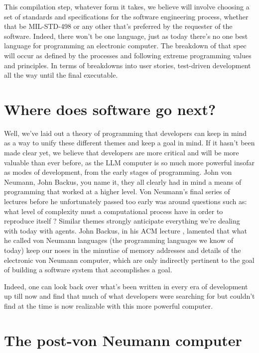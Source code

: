 \documentclass[12pt]{extarticle}
\begin{document}
This compilation step, whatever form it takes, we believe will involve choosing a set of standards and specifications for the software engineering process, whether that be MIL-STD-498 or any other that's preferred by the requester of the software. Indeed, there won't be one language, just as today there's no one best language for programming an electronic computer. The breakdown of that spec will occur as defined by the processes and following extreme programming values and principles. In terms of breakdowns into user stories, test-driven development all the way until the final executable.

\section{Where does software go next?}

Well, we've laid out a theory of programming that developers can keep in mind as a way to unify these different themes and keep a goal in mind. If it hasn't been made clear yet, we believe that developers are more critical and will be more valuable than ever before, as the LLM computer is so much more powerful insofar as modes of development, from the early stages of programming. John von Neumann, John Backus, you name it, they all clearly had in mind a means of programming that worked at a higher level. Von Neumann's final series of lectures before he unfortunately passed too early was around questions such as: what level of complexity must a computational process have in order to reproduce itself \cite{vonneumann1966}? Similar themes strongly anticipate everything we're dealing with today with agents. John Backus, in his ACM lecture \cite{backus1978}, lamented that what he called von Neumann languages (the programming languages we know of today) keep our noses in the minutiae of memory addresses and details of the electronic von Neumann computer, which are only indirectly pertinent to the goal of building a software system that accomplishes a goal.

Indeed, one can look back over what's been written in every era of development up till now and find that much of what developers were searching for but couldn't find at the time is now realizable with this more powerful computer.

\section{The post-von Neumann computer}
\end{document}
